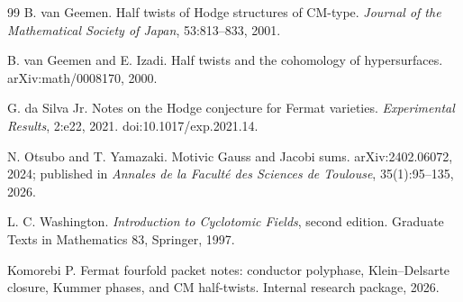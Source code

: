 \documentclass[11pt,oneside]{book}
\theoremstyle{definition}
\theoremstyle{remark}
\begin{document}
{\begin{thebibliography}{99}
B. van Geemen.
\newblock Half twists of Hodge structures of CM-type.
\newblock \emph{Journal of the Mathematical Society of Japan}, 53:813--833, 2001.

B. van Geemen and E. Izadi.
\newblock Half twists and the cohomology of hypersurfaces.
\newblock arXiv:math/0008170, 2000.


G. da Silva Jr.
\newblock Notes on the Hodge conjecture for Fermat varieties.
\newblock \emph{Experimental Results}, 2:e22, 2021.
\newblock doi:10.1017/exp.2021.14.

N. Otsubo and T. Yamazaki.
\newblock Motivic Gauss and Jacobi sums.
\newblock arXiv:2402.06072, 2024; published in \emph{Annales de la Facult\'e des Sciences de Toulouse}, 35(1):95--135, 2026.

L. C. Washington.
\newblock \emph{Introduction to Cyclotomic Fields}, second edition.
\newblock Graduate Texts in Mathematics 83, Springer, 1997.

Komorebi P.
\newblock Fermat fourfold packet notes: conductor polyphase, Klein--Delsarte closure, Kummer phases, and CM half-twists.
\newblock Internal research package, 2026.

\end{thebibliography}
}
\end{document}
